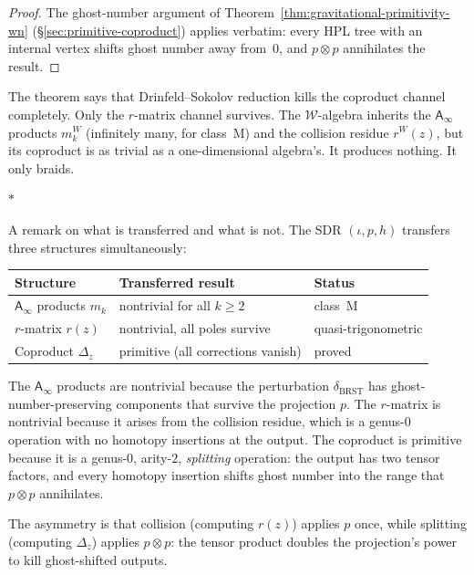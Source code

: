 \documentclass[11pt]{article}
\newcommand{\cW}{\mathcal{W}}
\newcommand{\Ainf}{\mathsf{A}_{\infty}}
\newcommand{\sep}{\bigskip\begin{center}$*$\end{center}\medskip}
\begin{document}
\begin{proof}
The ghost-number argument of
Theorem~\ref{thm:gravitational-primitivity-wn}
(\S\ref{sec:primitive-coproduct}) applies verbatim: every HPL
tree with an internal vertex shifts ghost number away from~$0$,
and $p \otimes p$ annihilates the result.
\end{proof}

The theorem says that Drinfeld--Sokolov reduction kills the
coproduct channel completely.  Only the $r$-matrix channel
survives.  The $\cW$-algebra inherits the $\Ainf$ products
$m_k^W$ (infinitely many, for class~M) and the collision
residue $r^W(z)$, but its coproduct is as trivial as a
one-dimensional algebra's.  It produces nothing.  It only
braids.

\sep

A remark on what is transferred and what is not.  The SDR
$(\iota, p, h)$ transfers three structures simultaneously:
\begin{center}
\small
\renewcommand{\arraystretch}{1.15}
\begin{tabular}{@{}lll@{}}
\textbf{Structure} & \textbf{Transferred result} & \textbf{Status} \\
\hline
$\Ainf$ products $m_k$ & nontrivial for all $k \geq 2$
  & class~M \\[3pt]
$r$-matrix $r(z)$ & nontrivial, all poles survive
  & quasi-trigonometric \\[3pt]
Coproduct $\Delta_z$ & primitive (all corrections vanish)
  & proved
\end{tabular}
\end{center}

\medskip

The $\Ainf$ products are nontrivial because the perturbation
$\delta_{\mathrm{BRST}}$ has ghost-number-preserving components
that survive the projection $p$.  The $r$-matrix is nontrivial
because it arises from the collision residue, which is a
genus-$0$ operation with no homotopy insertions at the output.
The coproduct is primitive because it is a genus-$0$,
arity-$2$, \textit{splitting} operation: the output has two
tensor factors, and every homotopy insertion shifts ghost number
into the range that $p \otimes p$ annihilates.

The asymmetry is that collision (computing $r(z)$) applies $p$
once, while splitting (computing $\Delta_z$) applies
$p \otimes p$: the tensor product doubles the projection's
power to kill ghost-shifted outputs.


\end{document}
